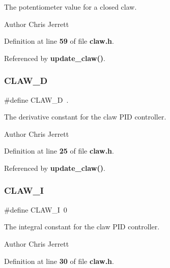The potentiometer value for a closed claw. 

\begin{DoxyAuthor}{Author}
Chris Jerrett 
\end{DoxyAuthor}


Definition at line \textbf{ 59} of file \textbf{ claw.\+h}.



Referenced by \textbf{ update\+\_\+claw()}.

\mbox{\label{claw_8h_afa5b4892ddbbfd14068e08422386bc3f}} 
\subsubsection{C\+L\+A\+W\+\_\+D}
{\footnotesize\ttfamily \#define C\+L\+A\+W\+\_\+D~.}



The derivative constant for the claw P\+ID controller. 

\begin{DoxyAuthor}{Author}
Chris Jerrett 
\end{DoxyAuthor}


Definition at line \textbf{ 25} of file \textbf{ claw.\+h}.



Referenced by \textbf{ update\+\_\+claw()}.

\mbox{\label{claw_8h_a012d8ac544ee8a7a6413cee1b456773c}} 
\subsubsection{C\+L\+A\+W\+\_\+I}
{\footnotesize\ttfamily \#define C\+L\+A\+W\+\_\+I~0}



The integral constant for the claw P\+ID controller. 

\begin{DoxyAuthor}{Author}
Chris Jerrett 
\end{DoxyAuthor}


Definition at line \textbf{ 30} of file \textbf{ claw.\+h}.

\mbox{\label{claw_8h_ae42993ee3f6f4a0e47f99060fe736ba0}} 
